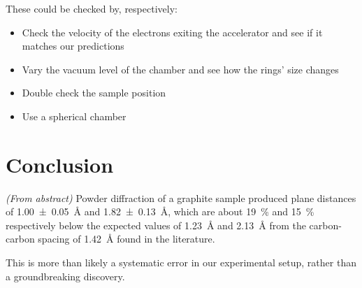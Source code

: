 \documentclass[a4paper]{scrartcl}
\begin{document}
These could be checked by, respectively:
\begin{itemize}
	\item Check the velocity of the electrons exiting the accelerator and see if it matches our predictions
	\item Vary the vacuum level of the chamber and see how the rings' size changes
	\item Double check the sample position
	\item Use a spherical chamber
\end{itemize}

\section{Conclusion}
\emph{(From abstract)} Powder diffraction of a graphite sample produced plane distances of \SI{1.00 \pm 0.05}{\angstrom} and \SI{1.82 \pm 0.13}{\angstrom}, which are about \SI{19}{\percent} and \SI{15}{\percent} respectively below the expected values of \SI{1.23}{\angstrom} and \SI{2.13}{\angstrom} from the carbon-carbon spacing of \SI{1.42}{\angstrom} found in the literature.

This is more than likely a systematic error in our experimental setup, rather than a groundbreaking discovery.

\printbibliography
\end{document}
